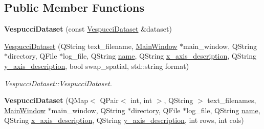 \subsection*{Public Member Functions}
\begin{DoxyCompactItemize}
\item 
\hypertarget{class_vespucci_dataset_acdb8eac7a6160db7a373995a79f8208f}{{\bfseries Vespucci\+Dataset} (const \hyperlink{class_vespucci_dataset}{Vespucci\+Dataset} \&dataset)}\label{class_vespucci_dataset_acdb8eac7a6160db7a373995a79f8208f}

\item 
\hyperlink{class_vespucci_dataset_a06df54f3af54a6a7dcd2d93fced57275}{Vespucci\+Dataset} (Q\+String text\+\_\+filename, \hyperlink{class_main_window}{Main\+Window} $\ast$main\+\_\+window, Q\+String $\ast$directory, Q\+File $\ast$log\+\_\+file, Q\+String \hyperlink{class_vespucci_dataset_ae5b30cb466acfdf741b360bc4f897cc9}{name}, Q\+String \hyperlink{class_vespucci_dataset_acb6a4de101573ac93f5fcb5dd5e38c5c}{x\+\_\+axis\+\_\+description}, Q\+String \hyperlink{class_vespucci_dataset_ae49a51e6e1666cea514bec6bf5578405}{y\+\_\+axis\+\_\+description}, bool swap\+\_\+spatial, std\+::string format)
\begin{DoxyCompactList}\small\item\em Vespucci\+Dataset\+::\+Vespucci\+Dataset. \end{DoxyCompactList}\item 
\hypertarget{class_vespucci_dataset_a3282fa5aecdab486d815db6c5452d3f9}{{\bfseries Vespucci\+Dataset} (Q\+Map$<$ Q\+Pair$<$ int, int $>$, Q\+String $>$ text\+\_\+filenames, \hyperlink{class_main_window}{Main\+Window} $\ast$main\+\_\+window, Q\+String $\ast$directory, Q\+File $\ast$log\+\_\+file, Q\+String \hyperlink{class_vespucci_dataset_ae5b30cb466acfdf741b360bc4f897cc9}{name}, Q\+String \hyperlink{class_vespucci_dataset_acb6a4de101573ac93f5fcb5dd5e38c5c}{x\+\_\+axis\+\_\+description}, Q\+String \hyperlink{class_vespucci_dataset_ae49a51e6e1666cea514bec6bf5578405}{y\+\_\+axis\+\_\+description}, int rows, int cols)}\label{class_vespucci_dataset_a3282fa5aecdab486d815db6c5452d3f9}


\end{DoxyCompactItemize}
